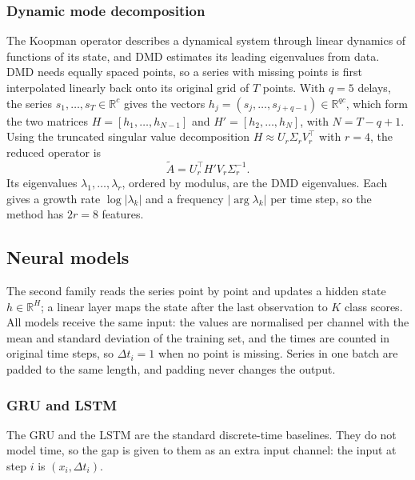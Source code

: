 \subsubsection*{Dynamic mode decomposition}
The Koopman operator \cite{koopman1931, mezic2005spectral} describes a
dynamical system through linear dynamics of functions of its state, and
DMD \cite{schmid2010dmd, kutz2016dmd} estimates its leading eigenvalues
from data. DMD needs equally spaced points, so a series with missing
points is first interpolated linearly back onto its original grid of $T$
points. With $q = 5$ delays, the series $s_1, \dots, s_T \in \mathbb{R}^c$
gives the vectors $h_j = (s_j, \dots, s_{j+q-1}) \in \mathbb{R}^{qc}$,
which form the two matrices
$H = [h_1, \dots, h_{N-1}]$ and $H' = [h_2, \dots, h_N]$, with
$N = T - q + 1$. Using the truncated singular value decomposition
$H \approx U_r \Sigma_r V_r^\top$ with $r = 4$, the reduced operator is
\[
  \tilde{A} = U_r^\top H' V_r \Sigma_r^{-1} .
\]
Its eigenvalues $\lambda_1, \dots, \lambda_r$, ordered by modulus, are the
DMD eigenvalues. Each gives a growth rate $\log\lvert\lambda_k\rvert$ and
a frequency $\lvert\arg\lambda_k\rvert$ per time step, so the method has
$2r = 8$ features.

\subsection{Neural models}\label{sec:neural}

The second family reads the series point by point and updates a hidden
state $h \in \mathbb{R}^H$; a linear layer maps the state after the last
observation to $K$ class scores. All models receive the same input: the
values are normalised per channel with the mean and standard deviation of
the training set, and the times are counted in original time steps, so
$\Delta t_i = 1$ when no point is missing. Series in one batch are padded
to the same length, and padding never changes the output.

\subsubsection*{GRU and LSTM}
The GRU \cite{cho2014gru} and the LSTM \cite{hochreiter1997lstm} are the
standard discrete-time baselines. They do not model time, so the gap is
given to them as an extra input channel: the input at step $i$ is
$(x_i, \Delta t_i)$.

